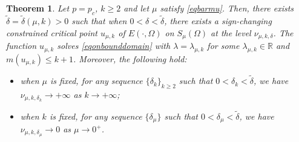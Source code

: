 \documentclass[10pt,a4paper]{article}
\newtheorem{theorem}{Theorem}[section]
\theoremstyle{definition} \theoremstyle{remark}
\numberwithin{equation}{section}
\newcommand{\R}{\mathbb{R}}
\newcommand{\la}{\lambda}
\begin{document}

\begin{theorem} \label{thmgenuscri}
	Let $p = p_c$, $k \geq 2$ and let $\mu$ satisfy \eqref{eqbarmu}. Then,
	there exists $\tilde \delta = \tilde \delta(\mu,k) > 0$ such that when $0 < \delta < \tilde \delta$, there exists a sign-changing constrained critical point $u_{\mu,k}$ of $E(\cdot,\Omega)$ on $S_\mu(\Omega)$ at the level $\nu_{\mu,k,\delta}$. The function $u_{\mu,k}$ solves \eqref{eqonbounddomain} with $\la = \la_{\mu,k}$ for some $\la_{\mu,k} \in \R$ and $m(u_{\mu,k}) \le k+1$. Moreover, the following hold:
	\begin{itemize}
		\item when $\mu$ is fixed, for any sequence $\{\delta_k\}_{k \ge 2}$ such that $0 < \delta_k < \tilde \delta$, we have $\nu_{\mu,k,\delta_k} \to +\infty$ as $k \to +\infty$;
		\item when $k$ is fixed, for any sequence $\{\delta_\mu\}$ such that $0 < \delta_\mu < \tilde \delta$, we have $\nu_{\mu,k,\delta_\mu} \to 0$ as $\mu \to 0^+$.
	\end{itemize}
\end{theorem}
\end{document}
